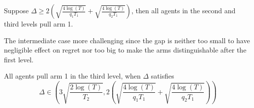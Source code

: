 \begin{lemma}\label{3levelbigcase}
  Suppose
  $\Delta \geq 2\left(\sqrt{\frac{4\log(T)}{q_1T_1}} +
    \sqrt{\frac{4\log(T)}{q_2T_1}}\right)$, then all agents in the
  second and third levels pull arm 1.
\end{lemma}


The intermediate case more challenging since the gap is neither too
small to have negligible effect on regret nor too big to make the arms
distinguishable after the first level.


\begin{lemma}\label{3levelmidcase}
  All agents pull arm 1 in the third level, when $\Delta$ satisfies
  \[
    \Delta\in \left( 3\sqrt{\frac{2\log(T)}{T_2}},
      2\left(\sqrt{\frac{4\log(T)}{q_1T_1}} +
        \sqrt{\frac{4\log(T)}{q_2T_1}}\right) \right)
  \]
\end{lemma}




